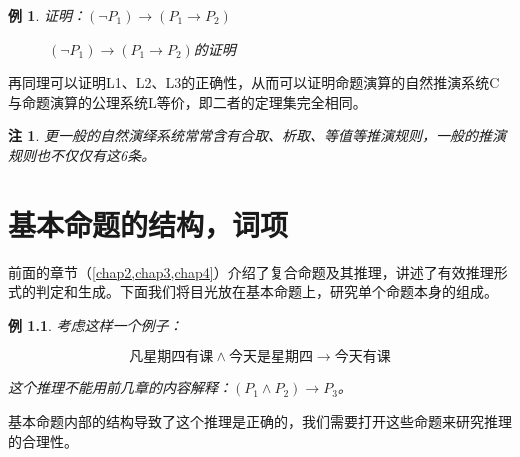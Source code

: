 \documentclass[12pt,onecolumn,a4paper]{book}
\newtheorem*{example}{例}
\newtheorem*{note}{注}
\numberwithin{table}{subsection}
\numberwithin{equation}{subsection}
\begin{document}
\begin{example}
    证明：$(\neg P_1) \rightarrow (P_1 \rightarrow P_2)$
    \begin{figure}[h]
        \centering
        \caption{$(\neg P_1) \rightarrow (P_1 \rightarrow P_2)$的证明}
    \end{figure}
\end{example}

\newpage
再同理可以证明L1、L2、L3的正确性，从而可以证明命题演算的自然推演系统C与命题演算的公理系统L等价，即二者的定理集完全相同。

\begin{note}
    更一般的自然演绎系统常常含有合取、析取、等值等推演规则，一般的推演规则也不仅仅有这6条。
\end{note}

\chapter{基本命题的结构，词项}\label{chap5}

前面的章节（\ref{chap2,chap3,chap4}）介绍了复合命题及其推理，讲述了有效推理形式的判定和生成。下面我们将目光放在基本命题上，研究单个命题本身的组成。

\begin{example}
    考虑这样一个例子：

    $$\text{凡星期四有课} \land \text{今天是星期四} \rightarrow \text{今天有课}$$

    这个推理不能用前几章的内容解释：$(P_1 \land P_2)\rightarrow P_3$。
\end{example}
基本命题内部的结构导致了这个推理是正确的，我们需要打开这些命题来研究推理的合理性。
\end{document}
